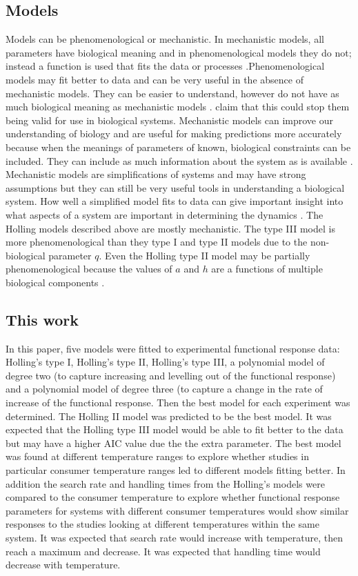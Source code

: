 \documentclass{article}
\begin{document}
\subsection{Models}
Models can be phenomenological or mechanistic. In mechanistic models, all parameters have biological meaning and in phenomenological models they do not; instead a function is used that fits the data or processes \cite{Otto2007AEvolution,Geritz2012MathematicalModels}.Phenomenological models may fit better to data and can be very useful in the absence of mechanistic models. They can be easier to understand, however do not have as much biological meaning as mechanistic models \cite{Otto2007AEvolution}. \cite{Geritz2012MathematicalModels} claim that this could stop them being valid for use in biological systems.  
Mechanistic models can improve our understanding of biology and are useful for making predictions more accurately because when the meanings of parameters of known, biological constraints can be included. They can include as much information about the system as is available \cite{Otto2007AEvolution,Kendall1999WhyApproaches}. Mechanistic models are simplifications of systems and may have strong assumptions but they can still be very useful tools in understanding a biological system. How well a simplified model fits to data can give important insight into what aspects of a system are important in determining the dynamics \cite{Geritz2012MathematicalModels}.
The Holling models described above are mostly mechanistic. The type III model is more phenomenological than they type I and type II models due to the non-biological parameter $q$. Even the Holling type II model may be partially phenomenological because the values of $a$ and $h$ are a functions of  multiple biological components \cite{Hassel1976TheDeath-Rate}.
\subsection{This work}
In this paper, five models were fitted to experimental functional response data: Holling's type I, Holling's type II, Holling's type III, a polynomial model of degree two (to capture increasing and levelling out of the functional response) and a polynomial model of degree three (to capture a change in the rate of increase of the functional response. Then the best model for each experiment was determined. The Holling II model was predicted to be the best model. It was expected that the Holling type III model would be able to fit better to the data but may have a higher AIC value due the the extra parameter.  The best model was found at different temperature ranges to explore whether studies in particular consumer temperature ranges led to different models fitting better. In addition the search rate and handling times from the Holling's models were compared to the consumer temperature to explore whether functional response parameters for systems with different consumer temperatures would show similar responses to the studies looking at different temperatures within the same system. It was expected that search rate would increase with temperature, then reach a maximum and decrease. It was expected that handling time would decrease with temperature.
\end{document}
